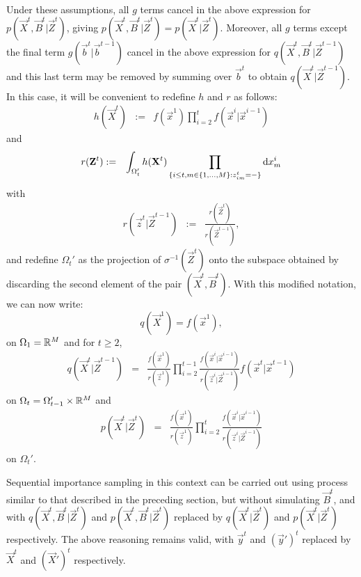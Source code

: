 Under these assumptions, all $g$ terms cancel in the above expression for $p(\vec{X}^t, \vec{B}^t | \vec{Z}^t)$, giving $p(\vec{X}^t, \vec{B}^t | \vec{Z}^t) = p(\vec{X}^t | \vec{Z}^t)$. Moreover, all $g$ terms except the final term $g(\vec{b}^t | \vec{b}^{t-1})$ cancel in the above expression for $q(\vec{X}^t, \vec{B}^t | \vec{Z}^{t-1})$ and this last term may be removed by summing over $\vec{b}^t$ to obtain $q(\vec{X}^t | \vec{Z}^{t-1})$. In this case, it will be convenient to redefine $h$ and $r$ as follows:
\begin{eqnarray*}
h(\vec{X}^t) & := & f(\vec{x}^1)\prod_{i=2}^{t} f(\vec{x}^i | \vec{x}^{i-1})
\end{eqnarray*}
and
\begin{eqnarray*}
r(\mathbf{Z}^t) & := & \int_{\Omega_t'}  h(\mathbf{X}^t) \prod_{ \{ i \leq t, m \in \{1, \ldots, M \} : z^t_{im} = - \} } \operatorname{d}\!{x}^i_m
\end{eqnarray*}
with
\begin{eqnarray*}
r(\vec{z}^t | \vec{Z}^{t-1}) & := & \frac{r(\vec{Z}^t)}{r(\vec{Z}^{t-1})},
\end{eqnarray*}
and redefine $\Omega_t'$ as the projection of $\sigma^{-1}(\vec{Z}^t)$ onto the subspace obtained by discarding the second element of the pair $(\vec{X}^t,\vec{B}^t)$. With this modified notation, we can now write:
\[
q(\vec{X}^1) = f(\vec{x}^1),
\]
on $\Omega_1 = \mathbb R^M$ and for $t \geq 2$,
\begin{eqnarray*}
    q(\vec{X}^t | \vec{Z}^{t-1}) & = & \frac{f(\vec{x}^1)}{r(\vec{z}^1)}  \prod_{i=2}^{t-1} \frac{f(\vec{x}^i | \vec{x}^{i-1}) }{r(\vec{z}^i | \vec{Z}^{i-1})} f(\vec{x}^t | \vec{x}^{t-1})
\end{eqnarray*}
on $\Omega_t = \Omega_{t-1}' \times \mathbb R^M $ and 
\begin{eqnarray*}
    p(\vec{X}^t | \vec{Z}^t) 
& = & \frac{f(\vec{x}^1)}{r(\vec{z}^1)} \prod_{i=2}^t \frac{f(\vec{x}^i | \vec{x}^{i-1}) }{r(\vec{z}^i | \vec{Z}^{i-1})} 
\end{eqnarray*}
on $\Omega_t'$.

Sequential importance sampling in this context can be carried out using process similar to that described in the preceding section, but without simulating $\vec{B}^t$, and with $q(\vec{X}^t, \vec{B}^t | \vec{Z}^t)$ and $p(\vec{X}^t, \vec{B}^t | \vec{Z}^t)$ replaced by  $q(\vec{X}^t | \vec{Z}^t)$ and $p(\vec{X}^t | \vec{Z}^t)$ respectively. The above reasoning remains valid, with $\vec{y}^t$ and $(\vec{y}')^t$ replaced by $\vec{X}^t$ and $(\vec{X}')^t$ respectively. 


